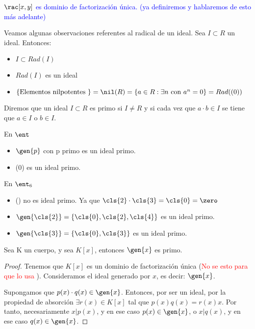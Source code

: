\textcolor{blue}{\obs $\rac[x,y]$ es dominio de factorización única. (ya definiremos y hablaremos de esto más adelante)}

Veamos algunas observaciones referentes al radical de un ideal. Sea $I \subset R$ un ideal. Entonces:
\begin{itemize}
	\item $I \subset Rad(I)$
	\item $Rad(I)$ es un ideal
	\item $\{\text{Elementos nilpotentes }\}=\nil(R)=\{a\in R: \exists n \text{ con }a^n=0 \}=Rad((0))$
\end{itemize}

\begin{defn}
	Diremos que un ideal $I\subset R$ es primo si $I\neq R$ y si cada vez que $a\cdot b \in I$ se tiene que $a\in I$ o $b\in I$.
\end{defn}

\begin{example} En $\ent$
	\begin{itemize}
		\item $\gen{p}$ con p primo es un ideal primo.
		\item (0) es un ideal primo.
	\end{itemize}
\end{example}

\begin{example} En $\ent_6$
	\begin{itemize}
		\item (\zero) no es ideal primo. Ya que $\cls{2} \cdot \cls{3}=\cls{0}=\zero$
		\item $\gen{\cls{2}}=\{\cls{0},\cls{2},\cls{4} \}$ es un ideal primo.
		\item $\gen{\cls{3}}=\{\cls{0},\cls{3} \}$ es un ideal primo.
	\end{itemize}
\end{example}

\begin{prop}
	Sea K un cuerpo, y sea $K[x]$, entonces $\gen{x}$ es primo.
\end{prop}
\begin{proof}
	Tenemos que $K[x]$ es un dominio de factorización única (\textcolor{red}{No se esto para que lo usa} ). Consideramos el ideal generado por $x$, es decir: $\gen{x}$.

	Supongamos que $p(x)\cdot q(x) \in \gen{x}$. Entonces, por ser un ideal, por la propiedad de absorción $\exists r(x) \in K[x]$ tal que $p(x) q(x)=r(x) x$. Por tanto, necesariamente $x|p(x)$, y en ese caso $p(x) \in \gen{x}$, o $x|q(x)$, y en ese caso $q(x) \in \gen{x}$.
\end{proof}

